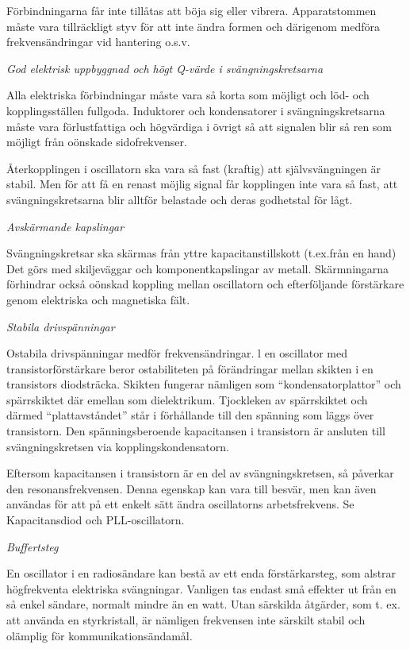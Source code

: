 Förbindningarna får inte tillåtas att böja sig eller
vibrera. Apparatstommen måste vara tillräckligt styv för att inte
ändra formen och därigenom medföra frekvensändringar vid hantering
o.s.v.

\emph{God elektrisk uppbyggnad och högt Q-värde i svängningskretsarna}

Alla elektriska förbindningar måste vara så korta som möjligt och löd-
och kopplingsställen fullgoda. Induktorer och kondensatorer i
svängningskretsarna måste vara förlustfattiga och högvärdiga i övrigt
så att signalen blir så ren som möjligt från oönskade sidofrekvenser.

Återkopplingen i oscillatorn ska vara så fast (kraftig) att
självsvängningen är stabil.  Men för att få en renast möjlig signal
får kopplingen inte vara så fast, att svängningskretsarna blir alltför
belastade och deras godhetstal för lågt.

\emph{Avskärmande kapslingar}

Svängningskretsar ska skärmas från yttre kapacitanstillskott
(t.ex.från en hand) Det görs med skiljeväggar och komponentkapslingar
av metall. Skärmningarna förhindrar också oönskad koppling mellan
oscillatorn och efterföljande förstärkare genom elektriska och
magnetiska fält.

\emph{Stabila drivspänningar}

Ostabila drivspänningar medför frekvensändringar. l en oscillator med
transistorförstärkare beror ostabiliteten på förändringar mellan
skikten i en transistors diodsträcka.  Skikten fungerar nämligen som
``kondensatorplattor'' och spärrskiktet där emellan som
dielektrikum. Tjockleken av spärrskiktet och därmed ``plattavståndet''
står i förhållande till den spänning som läggs över transistorn.  Den
spänningsberoende kapacitansen i transistorn är ansluten till
svängningskretsen via kopplingskondensatorn.

Eftersom kapacitansen i transistorn är en del av svängningskretsen, så
påverkar den resonansfrekvensen. Denna egenskap kan vara till besvär,
men kan även användas för att på ett enkelt sätt ändra oscillatorns
arbetsfrekvens.  Se Kapacitansdiod och PLL-oscillatorn.

\emph{Buffertsteg}

En oscillator i en radiosändare kan bestå av ett enda förstärkarsteg,
som alstrar högfrekventa elektriska svängningar. Vanligen tas endast
små effekter ut från en så enkel sändare, normalt mindre än en
watt. Utan särskilda åtgärder, som t. ex. att använda en styrkristall,
är nämligen frekvensen inte särskilt stabil och olämplig för
kommunikationsändamål.


